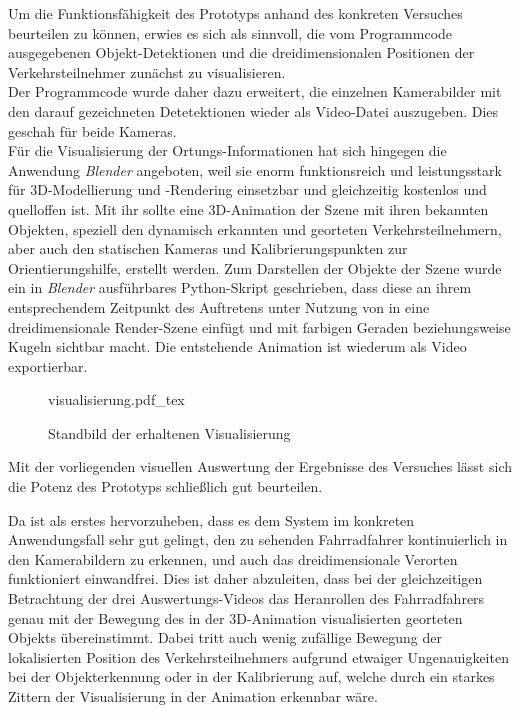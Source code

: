 Um die Funktionsfähigkeit des Prototyps anhand des konkreten Versuches beurteilen zu können, erwies es sich als sinnvoll, die vom Programmcode ausgegebenen Objekt-Detektionen und die dreidimensionalen Positionen der Verkehrsteilnehmer zunächst zu visualisieren.\\
Der Programmcode wurde daher dazu erweitert, die einzelnen Kamerabilder mit den darauf gezeichneten Detetektionen wieder als Video-Datei auszugeben. Dies geschah für beide Kameras.\\
Für die Visualisierung der Ortungs-Informationen hat sich hingegen die Anwendung \emph{Blender} \cite{blender} angeboten, weil sie enorm funktionsreich und leistungsstark für 3D-Modellierung und -Rendering einsetzbar und gleichzeitig kostenlos und quelloffen ist. Mit ihr sollte eine 3D-Animation der Szene mit ihren bekannten Objekten, speziell den dynamisch erkannten und georteten Verkehrsteilnehmern, aber auch den statischen Kameras und Kalibrierungspunkten zur Orientierungshilfe, erstellt werden. Zum Darstellen der Objekte der Szene wurde ein in \emph{Blender} ausführbares Python-Skript geschrieben, dass diese an ihrem entsprechendem Zeitpunkt des Auftretens unter Nutzung von  in eine dreidimensionale Render-Szene einfügt und mit farbigen Geraden beziehungsweise Kugeln sichtbar macht. Die entstehende Animation ist wiederum als Video exportierbar.\kleinerabstand

\begin{figure}[H]
	\centering
	\def\svgwidth{13.5cm}
	{visualisierung.pdf_tex}
	\caption{Standbild der erhaltenen Visualisierung}
	\label{fig:xvisualisierung_all_sample_frame}
\end{figure}
\kleinerabstand

Mit der vorliegenden visuellen Auswertung der Ergebnisse des Versuches lässt sich die Potenz des Prototyps schließlich gut beurteilen.\kleinerabstand

\noindent Da ist als erstes hervorzuheben, dass es dem System im konkreten Anwendungsfall sehr gut gelingt, den zu sehenden Fahrradfahrer kontinuierlich in den Kamerabildern zu erkennen, und auch das dreidimensionale Verorten funktioniert einwandfrei. Dies ist daher abzuleiten, dass bei der gleichzeitigen Betrachtung der drei Auswertungs-Videos das Heranrollen des Fahrradfahrers genau mit der Bewegung des in der 3D-Animation visualisierten georteten Objekts übereinstimmt. Dabei tritt auch wenig zufällige Bewegung der lokalisierten Position des Verkehrsteilnehmers aufgrund etwaiger Ungenauigkeiten bei der Objekterkennung oder in der Kalibrierung auf, welche durch ein starkes Zittern der Visualisierung in der Animation erkennbar wäre.\kleinerabstand

